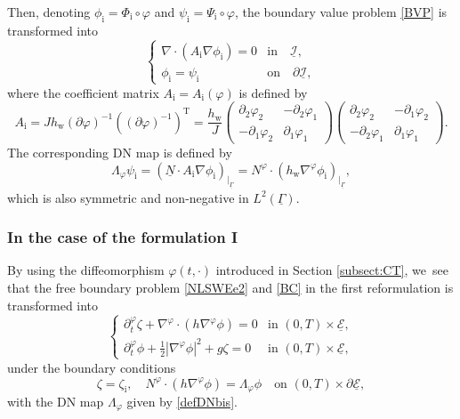 \documentclass[11pt]{article}
\newcommand{\dt}{\partial_t}
\newcommand{\cI}{{\mathcal I}}
\newcommand{\cE}{{\mathcal E}}
\newcommand{\ul}[1]{\underline{#1}}
\newcommand{\itGamma}{\mathit{\Gamma}}
\theoremstyle{definition}
\begin{document}
Then, denoting $\phi_\mathrm{i}=\Phi_\mathrm{i}\circ \varphi$ and $\psi_\mathrm{i}=\Psi_\mathrm{i}\circ\varphi$, the boundary value problem \eqref{BVP} is transformed into
\begin{equation}\label{BVP2}
\begin{cases}
\nabla\cdot(A_\mathrm{i}\nabla\phi_\mathrm{i}) = 0 & \mbox{in} \quad \ul{\cI}, \\
\phi_\mathrm{i} = \psi_\mathrm{i} & \mbox{on} \quad \partial \ul{\cI},
\end{cases}
\end{equation}
where the coefficient matrix $A_\mathrm{i}=A_\mathrm{i}(\varphi)$ is defined by
\[
A_\mathrm{i} = J h_\mathrm{w} (\partial\varphi)^{-1}((\partial\varphi)^{-1})^\mathrm{T}
= \frac{h_\mathrm{w}}{J}
\begin{pmatrix}
\partial_2\varphi_2 & -\partial_2\varphi_1 \\
-\partial_1\varphi_2 & \partial_1\varphi_1
\end{pmatrix}
\begin{pmatrix}
\partial_2\varphi_2 & -\partial_1\varphi_2 \\
-\partial_2\varphi_1 & \partial_1\varphi_1
\end{pmatrix}.
\]
The corresponding DN map is defined by
\begin{equation}\label{defDNbis}
\Lambda_\varphi \psi_\mathrm{i} = (\ul{N}\cdot A_\mathrm{i}\nabla\phi_\mathrm{i})_{\vert_{\ul{\itGamma}}}
= N^\varphi \cdot (h_\mathrm{w} \nabla^\varphi \phi_\mathrm{i})_{\vert_{\ul{\itGamma}}},
\end{equation}
which is also symmetric and non-negative in $L^2(\ul{\itGamma})$.

\subsubsection{In the case of the formulation I}
By using the diffeomorphism $\varphi(t,\cdot)$ introduced in Section \ref{subsect:CT}, we~see that the free boundary problem \eqref{NLSWEe2} and \eqref{BC} in the first reformulation is transformed into
\begin{equation}\label{NLSWEe3}
\begin{cases}
\dt^\varphi \zeta + \nabla^\varphi \cdot (h\nabla^\varphi \phi) = 0 &\text{in } (0,T)\times\ul{\cE}, \\
\dt^\varphi \phi + \frac12|\nabla^\varphi \phi|^2 + g \zeta = 0 &\text{in } (0,T)\times\ul{\cE},
\end{cases}
\end{equation}
under the boundary conditions
\begin{equation}\label{BC2}
\zeta = \zeta_\mathrm{i}, \quad N^\varphi \cdot (h \nabla^\varphi \phi) = \Lambda_\varphi \phi \quad\text{on } (0,T)\times\partial \ul{\cE},
\end{equation}
with the DN map $\Lambda_\varphi$ given by \eqref{defDNbis}.
\end{document}
